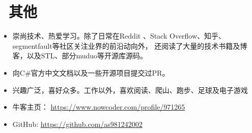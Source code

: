 \documentclass{resume}
\begin{document}
\section{\faInfo\ 其他}
\begin{itemize}[parsep=0.25ex]
  \item 崇尚技术、热爱学习。除了日常在Reddit 、Stack Overflow、知乎、segmentfault等社区关注业界的前沿动向外，
	   还阅读了大量的技术书籍及博客，以及STL、部分muduo等开源库源码。
  \item 向C\#官方中文文档以及一些开源项目提交过PR。
  \item 兴趣广泛，喜好众多。工作以外，喜欢阅读、爬山、跑步、足球及电子游戏
  \item 牛客主页： \url{https://www.nowcoder.com/profile/971265}
  \item GitHub: \url{https://github.com/as981242002}
\end{itemize}

%
%
\end{document}

